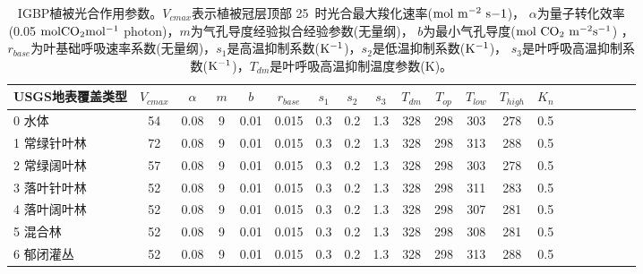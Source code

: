     \begin{sidewaystable}[]
        \centering
        \caption{IGBP植被光合作用参数。$V_{cmax}$表示植被冠层顶部 25~\textcelsius 时光合最大羧化速率($\rm mol\ m^{-2}\ s{-1}$)，
        $\alpha$为量子转化效率(0.05 $\rm mol CO_2 mol^{-1}$ photon)，$m$为气孔导度经验拟合经验参数(无量纲)，
        $b$为最小气孔导度($\rm mol\ CO_2\ m^{-2}s^{-1}$) ，
        $r_{base}$为叶基础呼吸速率系数(无量纲)，$s_1$是高温抑制系数($\rm K^{-1}$)，$s_2$是低温抑制系数($\rm K^{-1}$)，
        $s_3$是叶呼吸高温抑制系数($\rm K^{-1}$)，$T_{dm}$是叶呼吸高温抑制温度参数(K)。}
        \label{tab:IGBP植被光合作用参数1}
        \begin{tabular}{@{}lccccccccccccccccccc@{}}
        \toprule
        USGS地表覆盖类型     &$ V_{cmax}$ & $\alpha$ & $m$& $b$ & $r_{base}$ & $s_1$ & $s_2$ & $s_3$ & $T_{dm}$ & $T_{op}$ & $T_{low}$ & $T_{high}$ & $K_n$  \\ \midrule
        0 水体          & 54 & 0.08 & 9 & 0.01 & 0.015 & 0.3 & 0.2 & 1.3 & 328 & 298 & 303 & 278 & 0.5 \\
        1 常绿针叶林       & 72          & 0.08          & 9          & 0.01          & 0.015          & 0.3          & 0.2          & 1.3          & 328          & 298          & 313          & 288          & 0.5          \\
        2 常绿阔叶林       & 57          & 0.08          & 9          & 0.01          & 0.015          & 0.3          & 0.2          & 1.3          & 328          & 298          & 303          & 278          & 0.5          \\
        3 落叶针叶林       & 52          & 0.08          & 9          & 0.01          & 0.015          & 0.3          & 0.2          & 1.3          & 328          & 298          & 311          & 283          & 0.5          \\
        4 落叶阔叶林       & 52          & 0.08          & 9          & 0.01          & 0.015          & 0.3          & 0.2          & 1.3          & 328          & 298          & 307          & 281          & 0.5          \\
        5 混合林         & 52          & 0.08          & 9          & 0.01          & 0.015          & 0.3          & 0.2          & 1.3          & 328          & 298          & 308          & 281          & 0.5          \\
        6 郁闭灌丛        & 52          & 0.08          & 9          & 0.01          & 0.015          & 0.3          & 0.2          & 1.3          & 328          & 298          & 313          & 288          & 0.5          \\

\end{tabular}
\end{sidewaystable}
